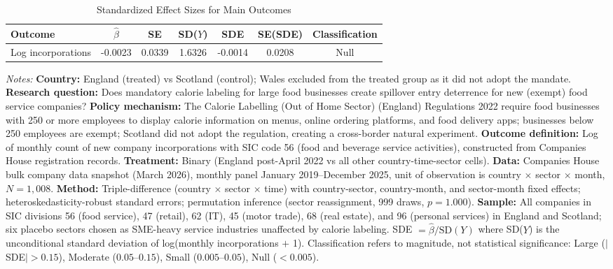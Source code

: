 \begin{table}[H]
\centering
\caption{Standardized Effect Sizes for Main Outcomes}
\label{tab:sde}
\begin{threeparttable}
\begin{tabular}{lcccccc}
\toprule
Outcome & $\hat{\beta}$ & SE & SD($Y$) & SDE & SE(SDE) & Classification \\
\midrule
Log incorporations & -0.0023 & 0.0339 & 1.6326 & -0.0014 & 0.0208 & Null \\
\bottomrule
\end{tabular}
\begin{tablenotes}[flushleft]
\small
\item \textit{Notes:} \textbf{Country:} England (treated) vs Scotland (control); Wales excluded from the treated group as it did not adopt the mandate. \textbf{Research question:} Does mandatory calorie labeling for large food businesses create spillover entry deterrence for new (exempt) food service companies? \textbf{Policy mechanism:} The Calorie Labelling (Out of Home Sector) (England) Regulations 2022 require food businesses with 250 or more employees to display calorie information on menus, online ordering platforms, and food delivery apps; businesses below 250 employees are exempt; Scotland did not adopt the regulation, creating a cross-border natural experiment. \textbf{Outcome definition:} Log of monthly count of new company incorporations with SIC code 56 (food and beverage service activities), constructed from Companies House registration records. \textbf{Treatment:} Binary (England post-April 2022 vs all other country-time-sector cells). \textbf{Data:} Companies House bulk company data snapshot (March 2026), monthly panel January 2019--December 2025, unit of observation is country $\times$ sector $\times$ month, $N = 1{,}008$. \textbf{Method:} Triple-difference (country $\times$ sector $\times$ time) with country-sector, country-month, and sector-month fixed effects; heteroskedasticity-robust standard errors; permutation inference (sector reassignment, 999 draws, $p = 1.000$). \textbf{Sample:} All companies in SIC divisions 56 (food service), 47 (retail), 62 (IT), 45 (motor trade), 68 (real estate), and 96 (personal services) in England and Scotland; six placebo sectors chosen as SME-heavy service industries unaffected by calorie labeling. SDE $= \hat{\beta} / \text{SD}(Y)$ where SD($Y$) is the unconditional standard deviation of log(monthly incorporations $+$ 1). Classification refers to magnitude, not statistical significance: Large ($|$SDE$| > 0.15$), Moderate ($0.05$--$0.15$), Small ($0.005$--$0.05$), Null ($< 0.005$).
\end{tablenotes}
\end{threeparttable}
\end{table}
